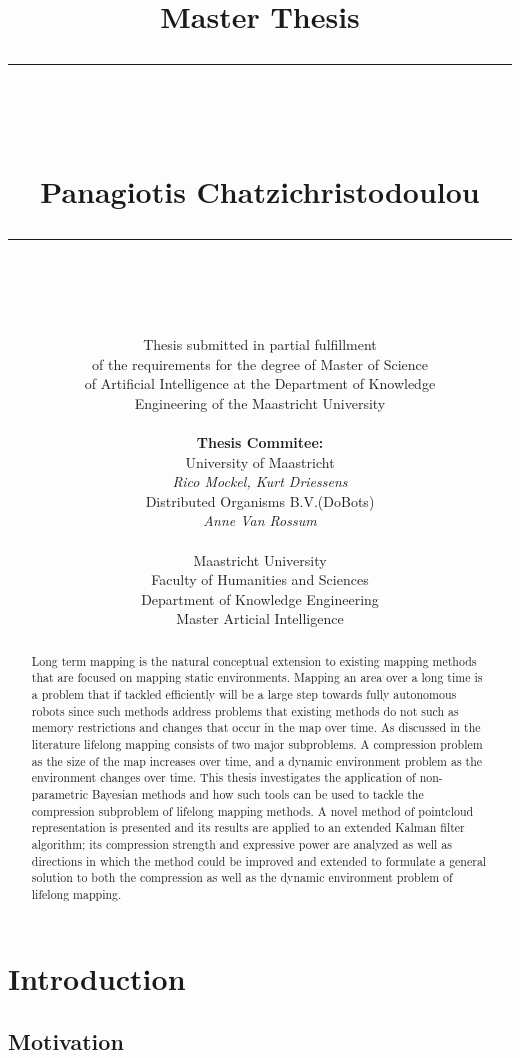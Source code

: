 \documentclass[twoside,hidelinks]{article}
\title{
\Huge{Master Thesis} \\
\noindent\rule{4cm}{0.4pt} \\
\vspace{5mm}
\huge{\selectfont{Towards lifelong mapping in pointclouds}}
\vspace{5mm} \\
\normalsize Panagiotis Chatzichristodoulou \\
\noindent\rule{4cm}{0.4pt} \\
\vspace{5mm}
\fontsize{24pt}{10pt}{Master Thesis DKE 09-16 }} %
\author{
\normalsize Thesis submitted in partial fulfillment\\
\normalsize  of the requirements for the degree of Master of Science \\
\normalsize of Artificial Intelligence at the Department of Knowledge \\
\normalsize  Engineering of the Maastricht University \\
\vspace{5mm} \\
\normalsize \textbf{Thesis Commitee:} \\ 
\normalsize University of Maastricht \\ %
\normalsize \textit{Rico Mockel, Kurt Driessens} \\
\normalsize Distributed Organisms B.V.(DoBots)\\
\normalsize \textit{Anne Van Rossum} \\
\vspace{0mm} \\
\normalsize Maastricht University \\
\normalsize Faculty of Humanities and Sciences \\ 
\normalsize Department of Knowledge Engineering \\
\normalsize Master Articial Intelligence \\
}
\begin{document}
\maketitle %

\thispagestyle{fancy} %

\newpage
\begin{abstract}

\noindent Long term mapping is the natural conceptual extension to existing mapping methods that are focused on mapping static environments. Mapping an area over a long time is a problem that if tackled efficiently will be a large step towards fully autonomous robots since such methods address problems that existing methods do not such as memory restrictions and changes that occur in the map over time. As discussed in the literature lifelong mapping consists of two major subproblems. A compression problem as the size of the map increases over time, and a dynamic environment problem as the environment changes over time. This thesis investigates the application of non-parametric Bayesian methods and how such tools can be used to tackle the compression subproblem of lifelong mapping methods. A novel method of pointcloud representation is presented and its results are applied to an extended Kalman filter algorithm; its compression strength and expressive power are analyzed as well as directions in which the method could be improved and extended to formulate a general solution to both the compression as well as the dynamic environment problem of lifelong mapping.


\end{abstract}

 
\tableofcontents
\listoffigures
 
 

\newpage


\section{Introduction}
\label{sec:Intro}

\subsection{Motivation}
\end{document}
